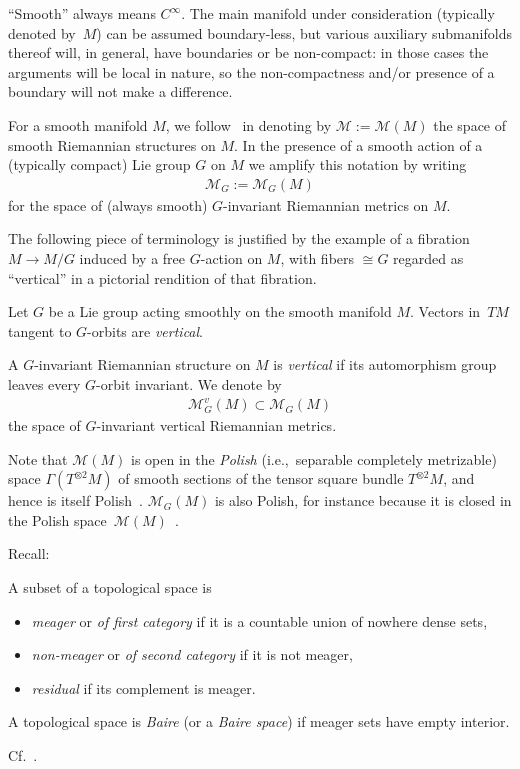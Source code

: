 \documentclass[pdftex]{sigma}%
\numberwithin{equation}{section}
\begin{document}
``Smooth'' always means $C^{\infty}$. The main manifold under consideration (typically denoted by~$M$) can be assumed boundary-less, but various auxiliary submanifolds thereof will, in general, have boundaries or be non-compact: in those cases the arguments will be local in nature, so the non-compactness and/or presence of a boundary will not make a difference.

For a smooth manifold $M$, we follow~\cite{eb} in denoting by $\mathcal{M}:=\mathcal{M}(M)$ the space of smooth Riemannian structures on $M$. In the presence of a smooth action of a (typically compact) Lie group $G$ on $M$ we amplify this notation by writing
\begin{gather*}
 \mathcal{M}_G:=\mathcal{M}_G(M)
\end{gather*}
for the space of (always smooth) $G$-invariant Riemannian metrics on $M$.

The following piece of terminology is justified by the example of a fibration $M\to M/G$ induced by a free $G$-action on $M$, with fibers $\cong G$ regarded as ``vertical'' in a pictorial rendition of that fibration.

\begin{Definition}\label{def:vert}
 Let $G$ be a Lie group acting smoothly on the smooth manifold $M$. Vectors in~$TM$ tangent to $G$-orbits are {\it vertical}.

 A $G$-invariant Riemannian structure on $M$ is {\it vertical} if its automorphism group leaves every $G$-orbit invariant. We denote by
 \begin{gather*}
 \mathcal{M}_G^v(M)\subset \mathcal{M}_G(M)
 \end{gather*}
 the space of $G$-invariant vertical Riemannian metrics.
\end{Definition}

Note that $\mathcal{M}(M)$ is open in the {\it Polish} (i.e.,~separable completely metrizable) space $\Gamma(T^{\otimes 2}M)$ of smooth sections of the tensor square bundle $T^{\otimes 2}M$, and hence is itself Polish~\cite[Appen\-dix, Proposition~A.1]{trev}. $\mathcal{M}_G(M)$ is also Polish, for instance because it is closed in the Polish space~$\mathcal{M}(M)$~\cite[Chapter~IX, Section~6.1, Proposition~1a)]{bour-top-2}.

Recall:

\begin{Definition}\label{def:cat1}
 A subset of a topological space is
 \begin{itemize}\itemsep=0pt
 \item {\it meager} or {\it of first category} if it is a countable union of nowhere dense sets,
 \item {\it non-meager} or {\it of second category} if it is not meager,
 \item {\it residual} if its complement is meager.
 \end{itemize}

 A topological space is {\it Baire} (or a {\it Baire space}) if meager sets have empty interior.
\end{Definition}
Cf.~\cite[Definitions 11.6.1 and 11.6.5]{nb}.
\end{document}
